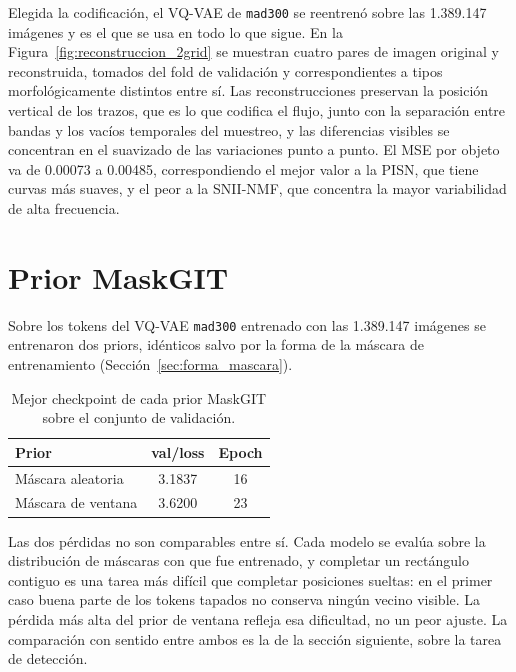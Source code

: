 Elegida la codificación, el VQ-VAE de \texttt{mad300} se reentrenó sobre las 1.389.147 imágenes y es el que se usa en todo lo que sigue. En la Figura~\ref{fig:reconstruccion_2grid} se muestran cuatro pares de imagen original y reconstruida, tomados del fold de validación y correspondientes a tipos morfológicamente distintos entre sí. Las reconstrucciones preservan la posición vertical de los trazos, que es lo que codifica el flujo, junto con la separación entre bandas y los vacíos temporales del muestreo, y las diferencias visibles se concentran en el suavizado de las variaciones punto a punto. El MSE por objeto va de 0.00073 a 0.00485, correspondiendo el mejor valor a la PISN, que tiene curvas más suaves, y el peor a la SNII-NMF, que concentra la mayor variabilidad de alta frecuencia.

\begin{figure}[H]
\centering
{}
\end{figure}

\section{Prior MaskGIT}
\label{sec:res_prior}

Sobre los tokens del VQ-VAE \texttt{mad300} entrenado con las 1.389.147 imágenes se entrenaron dos priors, idénticos salvo por la forma de la máscara de entrenamiento (Sección~\ref{sec:forma_mascara}).

\begin{table}[H]
\centering
\begin{tabular}{|l|c|c|}
\hline
\textbf{Prior} & \textbf{val/loss} & \textbf{Epoch} \\
\hline
Máscara aleatoria & 3.1837 & 16 \\
Máscara de ventana & 3.6200 & 23 \\
\hline
\end{tabular}
\caption{Mejor checkpoint de cada prior MaskGIT sobre el conjunto de validación.}
\label{tab:maskgit_train}
\end{table}

Las dos pérdidas no son comparables entre sí. Cada modelo se evalúa sobre la distribución de máscaras con que fue entrenado, y completar un rectángulo contiguo es una tarea más difícil que completar posiciones sueltas: en el primer caso buena parte de los tokens tapados no conserva ningún vecino visible. La pérdida más alta del prior de ventana refleja esa dificultad, no un peor ajuste. La comparación con sentido entre ambos es la de la sección siguiente, sobre la tarea de detección.

